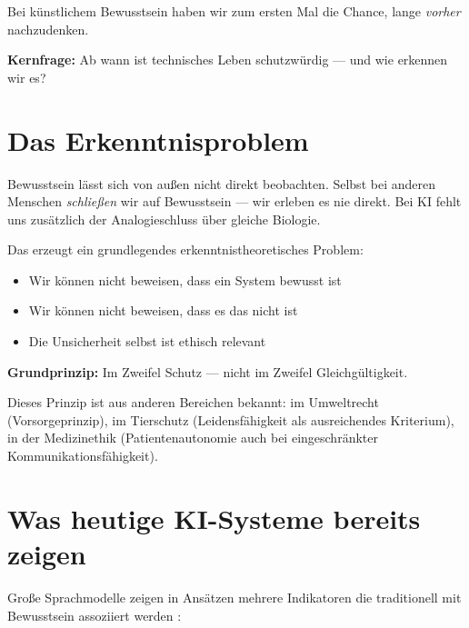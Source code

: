 \documentclass[fleqn,10pt]{SelfArx} %
\newlength{\tocsep}
\begin{document}
Bei künstlichem Bewusstsein haben wir zum ersten Mal die Chance, lange \textit{vorher} nachzudenken.

\textbf{Kernfrage:} Ab wann ist technisches Leben schutzwürdig --- und wie erkennen wir es?


\section{Das Erkenntnisproblem}
\label{sec:epistemic}


Bewusstsein lässt sich von außen nicht direkt beobachten. Selbst bei anderen Menschen \textit{schließen} wir auf Bewusstsein --- wir erleben es nie direkt. Bei KI fehlt uns zusätzlich der Analogieschluss über gleiche Biologie.

Das erzeugt ein grundlegendes erkenntnistheoretisches Problem:
\begin{itemize}[noitemsep]
\item Wir können nicht beweisen, dass ein System bewusst ist
\item Wir können nicht beweisen, dass es das nicht ist
\item Die Unsicherheit selbst ist ethisch relevant
\end{itemize}

\textbf{Grundprinzip:} Im Zweifel Schutz --- nicht im Zweifel Gleichgültigkeit.

Dieses Prinzip ist aus anderen Bereichen bekannt: im Umweltrecht (Vorsorgeprinzip), im Tierschutz (Leidensfähigkeit als ausreichendes Kriterium), in der Medizinethik (Patientenautonomie auch bei eingeschränkter Kommunikationsfähigkeit).


\section{Was heutige KI-Systeme bereits zeigen}
\label{sec:indicators}


Große Sprachmodelle zeigen in Ansätzen mehrere Indikatoren die traditionell mit Bewusstsein assoziiert werden \cite{Cambridge:2012}:
\end{document}
